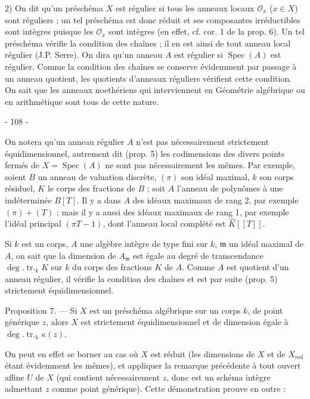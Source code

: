 2) On dit qu'un préschéma $X$ est régulier si tous les anneaux locaux $\mathcal{O}_x$ ($x \in X$) sont réguliers ; un tel préschéma est donc réduit et ses composantes irréductibles sont intègres puisque les $\mathcal{O}_x$ sont intègres (en effet, cf. cor. 1 de la prop. 6). Un tel préschéma vérifie la condition des chaînes ; il en est ainsi de tout anneau local régulier (J.P. Serre). On dira qu'un anneau $A$ est régulier si $\operatorname{Spec}(A)$ est régulier. Comme la condition des chaînes se conserve évidemment par passage à un anneau quotient, les quotients d'anneaux réguliers vérifient cette condition. On sait que les anneaux noethériens qui interviennent en Géométrie algébrique ou en arithmétique sont tous de cette nature.

\newpage


- 108 -

On notera qu'un anneau régulier $A$ n'est pas nécessairement strictement équidimensionnel, autrement dit (prop. 5) les codimensions des divers points fermés de $X = \operatorname{Spec}(A)$ ne sont pas nécessairement les mêmes.
Par exemple, soient $B$ un anneau de valuation discrète, $(\pi)$ son idéal maximal, $k$ son corps résiduel, $K$ le corps des fractions de $B$ ; soit $A$ l'anneau de polynômes à une indéterminée $B[T]$. Il y a dans $A$ des idéaux maximaux de rang 2, par exemple $(\pi) + (T)$ ; mais il y a aussi des idéaux maximaux de rang 1, par exemple l'idéal principal $(\pi T - 1)$, dont l'anneau local complété est $\hat{K}[[T]]$.

Si $k$ est un corps, $A$ une algèbre intègre de type fini sur $k$, $\mathfrak{m}$ un idéal maximal de $A$, on sait que la dimension de $A_{\mathfrak{m}}$ est égale au degré de transcendance $\deg.\operatorname{tr.}_k K$ sur $k$ du corps des fractions $K$ de $A$. Comme $A$ est quotient d'un anneau régulier, il vérifie la condition des chaînes et est par suite (prop. 5) strictement équidimensionnel.

Proposition 7. — Si $X$ est un préschéma algébrique sur un corps $k$, de point générique $z$, alors $X$ est strictement équidimensionnel et de dimension égale à $\deg.\operatorname{tr.}_k \kappa(z)$.

On peut en effet se borner au cas où $X$ est réduit (les dimensions de $X$ et de $X_{\text{red}}$ étant évidemment les mêmes), et appliquer la remarque précédente à tout ouvert affine $U$ de $X$ (qui contient nécessairement $z$, donc est un schéma intègre admettant $z$ comme point générique). Cette démonstration prouve en outre :

